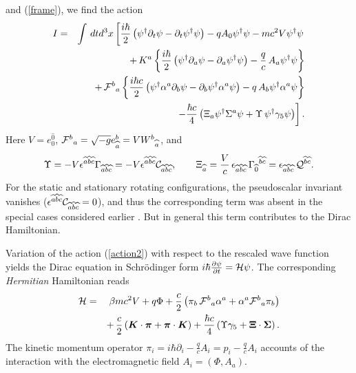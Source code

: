 \documentclass[preprint,showpacs,preprintnumbers,eqsecnum,amsmath,amssymb]{revtex4}
\begin{document}
and (\ref{frame}), we find the action
\begin{eqnarray}
I &=& \int\,dtd^3x\left[{\frac {i\hbar}{2}}\left(
\psi^\dagger\partial_t\psi - \partial_t\psi^\dagger\psi\right) -
qA_0\psi^\dagger\psi - mc^2V\psi^\dagger\psi\right.\nonumber\\
&& +\,K^a\left\{{\frac {i\hbar}{2}}\left(\psi^\dagger\partial_a\psi -\partial_a
\psi^\dagger\psi\right) - {\frac qc}\,A_a\psi^\dagger\psi\right\}\nonumber\\
&& +\,{\cal F}^b{}_a\left\{{\frac {i\hbar c}{2}}\left(\psi^\dagger\alpha^a
\partial_b\psi - \partial_b\psi^\dagger\alpha^a\psi\right)
- q\,A_b\psi^\dagger\alpha^a\psi\right\}\nonumber\\
&& \left. - {\frac {\hbar c} 4}\left(\Xi_a\psi^\dagger\Sigma^a\psi
+ \Upsilon\,\psi^\dagger\gamma_5\psi\right)\right].\label{action2}
\end{eqnarray}
Here $V = e_0^{\widehat{0}}$, ${\cal F}^b{}_a =
\sqrt{-g}e_{\widehat{a}}^b = VW^b{}_{\widehat a}$, and
\begin{equation}
\Upsilon = -V\epsilon^{\widehat{a}\widehat{b}\widehat{c}}\Gamma_{\widehat{a}
\widehat{b}\widehat{c}} = - V\epsilon^{\widehat{a}\widehat{b}\widehat{c}} 
{\cal C}_{\widehat{a}\widehat{b}\widehat{c}},\qquad \Xi_{\widehat{a}} =
{\frac Vc}\,\epsilon_{\widehat{a}\widehat{b}\widehat{c}}\,\Gamma_{\widehat{0}}
{}^{\widehat{b}\widehat{c}} = \epsilon_{\widehat{a}\widehat{b}\widehat{c}} 
\,{\cal Q}^{\widehat{b}\widehat{c}}.\label{AB}
\end{equation}
For the static and stationary rotating configurations, the
pseudoscalar invariant vanishes
($\epsilon^{\widehat{a}\widehat{b}\widehat{c}} {\cal
C}_{\widehat{a}\widehat{b}\widehat{c}} = 0$), and thus the
corresponding term was absent in the special cases considered
earlier \cite{OST}. But in general this term contributes to the
Dirac Hamiltonian.

Variation of the action (\ref{action2}) with respect to the
rescaled wave function yields the Dirac equation in Schr\"odinger
form $i\hbar\frac{\partial \psi} {\partial t}= {\cal H}\psi$. The
corresponding {\it Hermitian} Hamiltonian reads
\begin{eqnarray}
{\cal H} &=& \beta mc^2V + q\Phi + {\frac c 2}\left(\pi_b\,{\cal
F}^b{}_a \alpha^a + \alpha^a{\cal F}^b{}_a\pi_b\right)\nonumber\\
\label{Hamilton1} && +\,{\frac c2}\left(\bm{K}\cdot\bm{\pi} +
\bm{\pi}\cdot\bm{K}\right) + {\frac {\hbar c}4}\left(\Upsilon
\gamma_5 +\bm{\Xi}\cdot\bm{\Sigma}\right).
\end{eqnarray}
The kinetic momentum operator $\pi_i = i\hbar\partial_i- {\frac
qc}A_i= p_i- {\frac qc}A_i$ accounts of the interaction with the
electromagnetic field $A_i = (\Phi, A_a)$.
\end{document}
